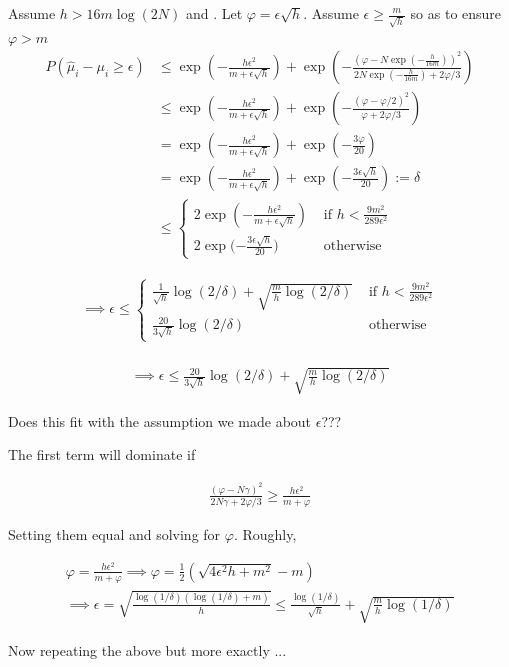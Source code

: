 \documentclass{article}
\newcommand{\eqn}[1]{\begin{align}#1\end{align}}
\theoremstyle{plain}
\theoremstyle{definition}
\begin{document}
Assume $h > 16m\log(2N)$ and . Let $\varphi = \epsilon\sqrt{h}$. Assume $\epsilon \geq \frac{m}{\sqrt{h}}$ so as to ensure $\varphi > m$
\eqn{
P(\hat{\mu}_i-\mu_i \geq \epsilon)& \leq \exp({-\frac{h\epsilon^2}{m+\epsilon\sqrt{h}}}) + \exp({-\frac{(\varphi-N\exp(-\frac{h}{16m}))^2}{2N\exp(-\frac{h}{16m}) + 2\varphi/3}})\\
& \leq \exp({-\frac{h\epsilon^2}{m+\epsilon\sqrt{h}}}) + \exp({-\frac{(\varphi-\varphi/2)^2}{\varphi + 2\varphi/3}})\\
& = \exp({-\frac{h\epsilon^2}{m+\epsilon\sqrt{h}}}) + \exp({-\frac{3\varphi}{20}})\\
& = \exp({-\frac{h\epsilon^2}{m+\epsilon\sqrt{h}}}) + \exp({-\frac{3\epsilon \sqrt{h}}{20}}) := \delta\\
& \leq \begin{cases}
2 \exp({-\frac{h\epsilon^2}{m+\epsilon\sqrt{h}}}) & \text{ if } h < \frac{9m^2}{289\epsilon^2} \\
2\exp({-\frac{3\epsilon\sqrt{h}}{20})} & \text{ otherwise } 
\end{cases}
}

\eqn{
\implies \epsilon \leq \begin{cases}
\frac{1}{\sqrt{h}}\log(2/\delta) + \sqrt{\frac{m}{h}\log(2/\delta)} & \text{ if } h < \frac{9m^2}{289\epsilon^2}\\
\frac{20}{3\sqrt{h}}\log(2/\delta) & \text{ otherwise }
\end{cases}\\
}

\eqn{
\implies \epsilon \leq \frac{20}{3\sqrt{h}}\log(2/\delta)+ \sqrt{\frac{m}{h}\log(2/\delta)} 
}

Does this fit with the assumption we made about $\epsilon$???

\pagebreak





The first term will dominate if 

\eqn{
\frac{(\varphi-N\gamma)^2}{2N\gamma + 2\varphi/3} \geq \frac{h\epsilon^2}{m+\varphi}
}


Setting them equal and solving for $\varphi$. Roughly,

\eqn{
\varphi = \frac{h\epsilon^2}{m+\varphi} \implies \varphi = \frac{1}{2}(\sqrt{4\epsilon^2 h+ m^2} - m)\\
\implies \epsilon = \sqrt{\frac{\log(1/\delta)(\log(1/\delta)+m)}{h}} \leq \frac{\log(1/\delta)}{\sqrt{h}} + \sqrt{\frac{m}{h}\log(1/\delta)}
}

Now repeating the above but more exactly ...
\end{document}
